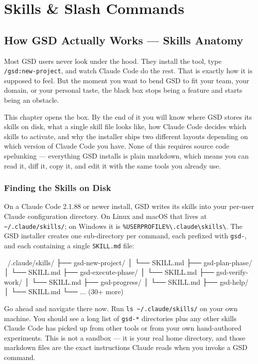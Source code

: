 \documentclass[11pt,letterpaper,openany]{book}
\begin{document}
\part{Skills \& Slash Commands}

\chapter{How GSD Actually Works --- Skills Anatomy}

Most GSD users never look under the hood. They install the tool, type
\texttt{/gsd:new-project}, and watch Claude Code do the rest. That is exactly
how it is supposed to feel. But the moment you want to bend GSD to fit your
team, your domain, or your personal taste, the black box stops being a
feature and starts being an obstacle.

This chapter opens the box. By the end of it you will know where GSD stores
its skills on disk, what a single skill file looks like, how Claude Code
decides which skills to activate, and why the installer ships two different
layouts depending on which version of Claude Code you have. None of this
requires source code spelunking --- everything GSD installs is plain
markdown, which means you can read it, diff it, copy it, and edit it with
the same tools you already use.

\section{Finding the Skills on Disk}

On a Claude Code 2.1.88 or newer install, GSD writes its skills into your
per-user Claude configuration directory. On Linux and macOS that lives at
\texttt{\~{}/.claude/skills/}; on Windows it is
\texttt{\%USERPROFILE\%\textbackslash.claude\textbackslash skills\textbackslash}.
The GSD installer creates one sub-directory per command, each prefixed with
\texttt{gsd-}, and each containing a single \texttt{SKILL.md} file:

\begin{gsdplain}
~/.claude/skills/
├── gsd-new-project/
│   └── SKILL.md
├── gsd-plan-phase/
│   └── SKILL.md
├── gsd-execute-phase/
│   └── SKILL.md
├── gsd-verify-work/
│   └── SKILL.md
├── gsd-progress/
│   └── SKILL.md
├── gsd-help/
│   └── SKILL.md
└── ... (30+ more)
\end{gsdplain}

Go ahead and navigate there now. Run \texttt{ls \~{}/.claude/skills/} on
your own machine. You should see a long list of \texttt{gsd-*} directories
plus any other skills Claude Code has picked up from other tools or from
your own hand-authored experiments. This is not a sandbox --- it is your
real home directory, and those markdown files are the exact instructions
Claude reads when you invoke a GSD command.
\end{document}
